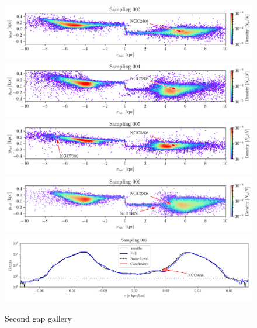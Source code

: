 \documentclass{aa}
\begin{document}
\begin{appendix}
    \begin{figure}
      \centering
      \includegraphics[width=\linewidth]{gallery_of_gaps_monte-carlo-003.png}      
      \includegraphics[width=\linewidth]{gallery_of_gaps_monte-carlo-004.png}
      \includegraphics[width=\linewidth]{gallery_of_gaps_monte-carlo-005.png}
      \includegraphics[width=\linewidth]{gallery_of_gaps_monte-carlo-006.png}
      \includegraphics[width=\linewidth]{tau-profile-monte-carlo-006.png}
      \caption{Second gap gallery}
      \label{fig:gallery1}
      \end{figure}        



\end{appendix}
\end{document}
